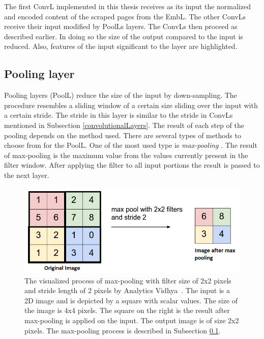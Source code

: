 The first ConvL implemented in this thesis receives as its input the normalized and encoded content of the scraped pages from the EmbL. The other ConvLs receive their input modified by PoolLs layers. The ConvLs then proceed as described earlier. In doing so the size of the output compared to the input is reduced. Also, features of the input significant to the layer are highlighted. 

\subsection{Pooling layer}\label{poolingLayers}
Pooling layers (PoolL) reduce the size of the input by down-sampling. The procedure resembles a sliding window of a certain size sliding over the input with a certain stride. The stride in this layer is similar to the stride in ConvLs mentioned in Subsection \ref{convolutionalLayers}. The result of each step of the pooling depends on the method used. There are several types of methods to choose from for the PoolL. One of the most used type is \textit{max-pooling} \cite{CNN}. The result of max-pooling is the maximum value from the values currently present in the filter window. After applying the filter to all input portions the result is passed to the next layer.
\begin{figure}[ht!]
  \centering
  \includegraphics[width=\textwidth]{Images/maxPooling.png}
  \caption{The visualized process of max-pooling with filter size of 2x2 pixels and stride length of 2 pixels by Analytics Vidhya~\cite{maxPoolingVisualization}. The input is a 2D image and is depicted by a square with scalar values. The size of the image is 4x4 pixels. The square on the right is the result after max-pooling is applied on the input. The output image is of size 2x2 pixels. The max-pooling process is described in Subsection \ref{poolingLayers}.} 
  \label{maxPoolingVisualization}
\end{figure} 

